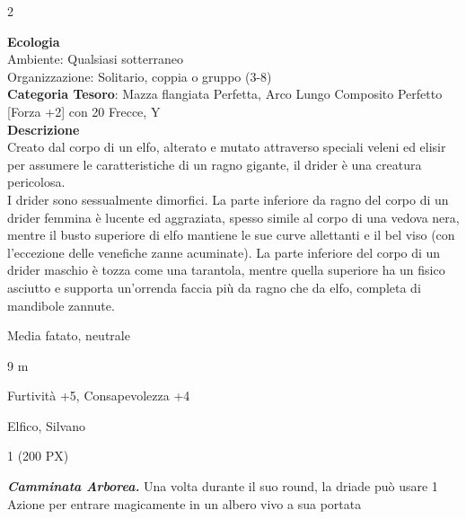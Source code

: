 \begin{multicols}{2}
{\textbf{Ecologia}\\
Ambiente: Qualsiasi sotterraneo\\
Organizzazione: Solitario, coppia o gruppo (3-8)\\
\textbf{Categoria Tesoro}: Mazza flangiata Perfetta, Arco Lungo Composito Perfetto [Forza +2] con 20 Frecce, Y\\
\textbf{Descrizione}\\
Creato dal corpo di un elfo, alterato e mutato attraverso speciali veleni ed elisir per assumere le caratteristiche di un ragno gigante, il drider è una creatura pericolosa.\\
I drider sono sessualmente dimorfici. La parte inferiore da ragno del corpo di un drider femmina è lucente ed aggraziata, spesso simile al corpo di una vedova nera, mentre il busto superiore di elfo mantiene le sue curve allettanti e il bel viso (con l'eccezione delle venefiche zanne acuminate). La parte inferiore del corpo di un drider maschio è tozza come una tarantola, mentre quella superiore ha un fisico asciutto e supporta un'orrenda faccia più da ragno che da elfo, completa di mandibole zannute.


\begin{description}[noitemsep, topsep=0pt, parsep=0pt, partopsep=0pt, itemsep=1pt, leftmargin=2.35cm,  labelwidth=2.2cm, itemindent=0cm, listparindent=0pt] %
\setlength{\baselineskip}{10pt}
\item[\textbf{Taglia/Tipo}] Media fatato, neutrale
\item[\textbf{Caratt.}] 
\item[\textbf{Punti Ferita}] 
\item[\textbf{Movimento}] 9 m
\item[\textbf{Tiri Salvez.}] 
\item[\textbf{Comp.}] Furtività +5, Consapevolezza +4
\item[\textbf{Sensi}] 
\item[\textbf{Linguaggi}] Elfico, Silvano
\item[\textbf{Sfida}] 1 (200 PX)
\end{description}
\smallskip

\emph{\textbf{Camminata Arborea.}} Una volta durante il suo round, la driade può usare 1 Azione per entrare magicamente in un albero vivo a sua portata

}
\end{multicols}
